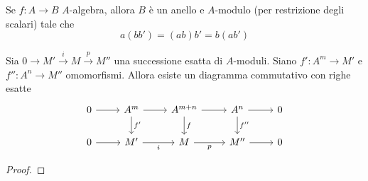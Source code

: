 
\begin{remark}
    Se \(f : A\to B\) \(A\)-algebra, allora \(B\) è un anello e \(A\)-modulo
    (per restrizione degli scalari) tale che 
    \[
      a{(b b')} = {(ab)}b' = b{(ab')}
    \]
\end{remark}



\begin{lemma}{}\label{lem:com}
    Sia \(0 \to M' \overset{i}{\to } M \overset{p}{\to } M''\) una successione
    esatta di \(A\)-moduli. Siano \(f': A^{m} \to M'\) e \(f'' : A^{n}\to M''\)
    omomorfismi. Allora esiste un diagramma commutativo con righe esatte
\[\begin{tikzcd}
	0 & A^{m} & A^{m+n} & A^{n} & 0 \\
	0 & M' & M & M'' & 0
	\arrow[from=1-1, to=1-2]
	\arrow[from=1-2, to=1-3]
	\arrow["{f'}", from=1-2, to=2-2]
	\arrow[from=1-3, to=1-4]
	\arrow["f", from=1-3, to=2-3]
	\arrow[from=1-4, to=1-5]
	\arrow["{f''}", from=1-4, to=2-4]
	\arrow[from=2-1, to=2-2]
	\arrow["i"', from=2-2, to=2-3]
	\arrow["p"', from=2-3, to=2-4]
	\arrow[from=2-4, to=2-5]
\end{tikzcd}\]
\end{lemma}

\begin{proof}{}
\end{proof}

